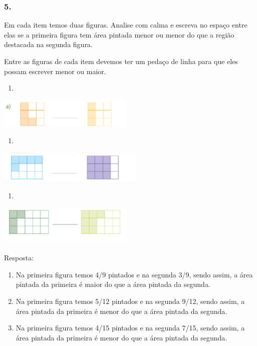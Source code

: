 \subsubsection{5. }\label{section-108}

Em cada item temos duas figuras. Analise com calma e escreva no espaço
entre elas se a primeira figura tem área pintada menor ou menor do que a
região destacada na segunda figura.

Entre as figuras de cada item devemos ter um pedaço de linha para que
eles possam escrever menor ou maior.

\begin{enumerate}
\def\labelenumi{\alph{enumi})}
\item
\end{enumerate}

\includegraphics[width=2.55022in,height=0.55005in]{media/image108.png}

\begin{enumerate}
\def\labelenumi{\alph{enumi})}
\item
\end{enumerate}

\includegraphics[width=2.75857in,height=0.60005in]{media/image109.png}

\begin{enumerate}
\def\labelenumi{\alph{enumi})}
\item
\end{enumerate}

\includegraphics[width=2.55022in,height=0.75006in]{media/image110.png}

Resposta:

\begin{enumerate}
\def\labelenumi{\alph{enumi})}
\item
  Na primeira figura temos 4/9 pintados e na segunda 3/9, sendo assim, a
  área pintada da primeira é maior do que a área pintada da segunda.
\item
  Na primeira figura temos 5/12 pintados e na segunda 9/12, sendo assim,
  a área pintada da primeira é menor do que a área pintada da segunda.
\item
  Na primeira figura temos 4/15 pintados e na segunda 7/15, sendo assim,
  a área pintada da primeira é menor do que a área pintada da segunda.
\end{enumerate}


